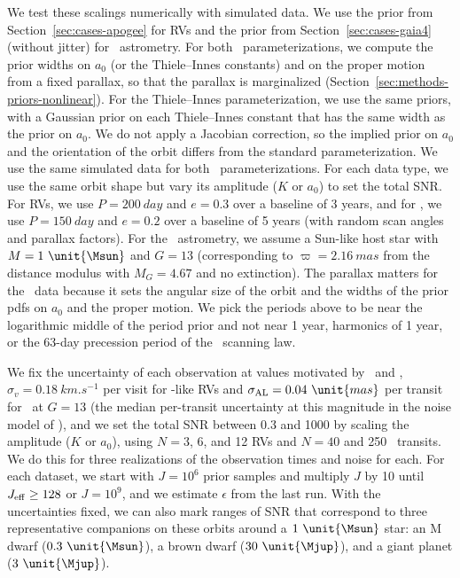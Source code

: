 \documentclass[twocolumn]{AASTeX7/aastex701}
\begin{document}
We test these scalings numerically with simulated data.
We use the prior from Section~\ref{sec:cases-apogee} for RVs and the prior from
Section~\ref{sec:cases-gaia4} (without jitter) for \gaia\ astrometry.
For both \gaia\ parameterizations, we compute the prior widths on $a_0$ (or the
Thiele--Innes constants) and on the proper motion from a fixed parallax, so that the
parallax is marginalized (Section~\ref{sec:methods-priors-nonlinear}).
For the Thiele--Innes parameterization, we use the same priors, with a Gaussian prior on
each Thiele--Innes constant that has the same width as the prior on $a_0$.
We do not apply a Jacobian correction, so the implied prior on $a_0$ and the orientation
of the orbit differs from the standard parameterization.
We use the same simulated data for both \gaia\ parameterizations.
For each data type, we use the same orbit shape but vary its amplitude ($K$ or $a_0$) to
set the total SNR.
For RVs, we use $P = 200~\unit{day}$ and $e = 0.3$ over a baseline of 3 years, and for
\gaia, we use $P = 150~\unit{day}$ and $e = 0.2$ over a baseline of 5 years (with random
scan angles and parallax factors).
For the \gaia\ astrometry, we assume a Sun-like host star with $M=1~\unit{\Msun}$ and $G
= 13$ (corresponding to $\varpi = 2.16~\unit{mas}$ from the distance modulus with $M_{G}
= 4.67$ and no extinction).
The parallax matters for the \gaia\ data because it sets the angular size of the orbit
and the widths of the prior pdfs on $a_0$ and the proper motion.
We pick the periods above to be near the logarithmic middle of the period prior and not
near 1 year, harmonics of 1 year, or the 63-day precession period of the \gaia\ scanning
law.

We fix the uncertainty of each observation at values motivated by \apogee\ and \gaia,
$\sigma_v = 0.18~\unit{km.s^{-1}}$ per visit for \apogee-like RVs and $\sigma_{\rm AL} =
0.04~\unit{mas}$ per transit for \gaia\ at $G = 13$ (the median per-transit uncertainty
at this magnitude in the noise model of \citealt{Yahalomi:2026}), and we set the total
SNR between 0.3 and 1000 by scaling the amplitude ($K$ or $a_0$), using $N = 3$, 6, and
12 RVs and $N = 40$ and 250 \gaia\ transits.
We do this for three realizations of the observation times and noise for each.
For each dataset, we start with $J = 10^6$ prior samples and multiply $J$ by 10 until
$J_{\rm eff} \geq 128$ or $J = 10^9$, and we estimate $\epsilon$ from the last run.
With the uncertainties fixed, we can also mark ranges of SNR that correspond to three
representative companions on these orbits around a $1~\unit{\Msun}$ star: an M dwarf
($0.3~\unit{\Msun}$), a brown dwarf ($30~\unit{\Mjup}$), and a giant planet
($3~\unit{\Mjup}$).
\end{document}
